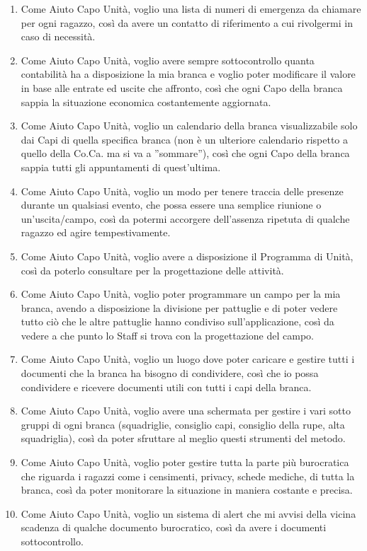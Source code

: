 \documentclass[11pt]{article}
\numberwithin{figure}{section}
\begin{document}
\begin{enumerate}[label=\textbf{US\arabic*:}]
  \item Come Aiuto Capo Unità, voglio una lista di numeri di emergenza da chiamare per ogni ragazzo, così da avere un contatto di riferimento a cui rivolgermi in caso di necessità.
  \item Come Aiuto Capo Unità, voglio avere sempre sottocontrollo quanta contabilità ha a disposizione la mia branca e voglio poter modificare il valore in base alle entrate ed uscite che affronto, così che ogni Capo della branca sappia la situazione economica costantemente aggiornata.
  \item Come Aiuto Capo Unità, voglio un calendario della branca visualizzabile solo dai Capi di quella specifica branca (non è un ulteriore calendario rispetto a quello della Co.Ca. ma si va a ”sommare”), così che ogni Capo della branca sappia tutti gli appuntamenti di quest’ultima.
  \item Come Aiuto Capo Unità, voglio un modo per tenere traccia delle presenze durante un qualsiasi evento, che possa essere una semplice riunione o un'uscita/campo, così da potermi accorgere dell’assenza ripetuta di qualche ragazzo ed agire tempestivamente.
  \item Come Aiuto Capo Unità, voglio avere a disposizione il Programma di Unità, così da poterlo consultare per la progettazione delle attività.
 \item Come Aiuto Capo Unità, voglio poter programmare un campo per la mia branca, avendo a disposizione la divisione per pattuglie e di poter vedere tutto ciò che le altre pattuglie hanno condiviso sull’applicazione, così da vedere a che punto lo Staff si trova con la progettazione del campo.
 \item Come Aiuto Capo Unità, voglio un luogo dove poter caricare e gestire tutti i documenti che la branca ha bisogno di condividere, così che io possa condividere e ricevere documenti utili con tutti i capi della branca.
 \item Come Aiuto Capo Unità, voglio avere una schermata per gestire i vari sotto gruppi di ogni branca (squadriglie, consiglio capi, consiglio della rupe, alta squadriglia), così da poter sfruttare al meglio questi strumenti del metodo.
 \item Come Aiuto Capo Unità, voglio poter gestire tutta la parte più burocratica che riguarda i ragazzi come i censimenti, privacy, schede mediche, di tutta la branca, così da poter monitorare la situazione in maniera costante e precisa.
 \item Come Aiuto Capo Unità, voglio un sistema di alert che mi avvisi della vicina scadenza di qualche documento burocratico, così da avere i documenti sottocontrollo.

\end{enumerate}
\end{document}
